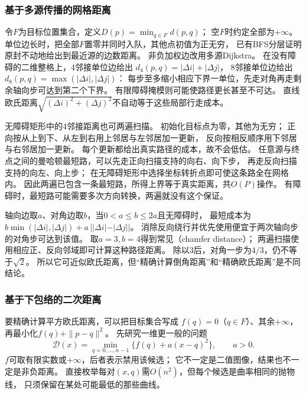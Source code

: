 \subsubsection{基于多源传播的网格距离}
\label{sec:graph-grid-distance}
令$F$为目标位置集合，定义$D(p)=\min_{q\in F}d(p,q)$；
空$F$时约定全部为$+\infty$。
单位边长时，把全部$F$置零并同时入队，其他点初值为正无穷，
已有BFS分层证明原封不动地给出到最近源的边数距离。
非负加权边改用多源Dijkstra。
在没有障碍的二维整格上，4邻接单位边给出
$d_4(p,q)=|\Delta i|+|\Delta j|$，
8邻接单位边给出$d_8(p,q)=\max(|\Delta i|,|\Delta j|)$：
每步至多缩小相应下界一单位，先走对角再走剩余轴向步可达到第二个下界。
有限障碍掩模则可能使路径更长甚至不可达。
直线欧氏距离$\sqrt{(\Delta i)^2+(\Delta j)^2}$不自动等于这些局部行走成本。

无障碍矩形中的4邻接距离也可两遍扫描。
初始化目标点为零，其他为无穷；
正向按从上到下、从左到右用上邻居与左邻居加一更新，
反向按相反顺序用下邻居与右邻居加一更新。
每个更新都给出真实路径的成本，故不会低估。
任意源与终点之间的曼哈顿最短路，可以先走正向扫描支持的向右、向下步，
再走反向扫描支持的向左、向上步；
在无障碍矩形中选择坐标转折点即可使这条路全在网格内。
因此两遍已包含一条最短路，所得上界等于真实距离，共$O(P)$操作。
有障碍时，最短路可能需要多次方向转换，两遍就没有这个保证。

轴向边取$a$、对角边取$b$，当$0<a\leq b\leq2a$且无障碍时，
最短成本为
$b\min(|\Delta i|,|\Delta j|)+a\,||\Delta i|-|\Delta j||$。
消除反向绕行并优先使用便宜于两次轴向步的对角步可达到该值。
取$a=3,b=4$得到常见（chamfer distance）；
两遍扫描使用相应正、反向邻域即可计算这种路径距离。
除以$3$后，对角一步为$4/3$，仍不等于$\sqrt2$。
所以它可近似欧氏距离，但“精确计算倒角距离”和“精确欧氏距离”是不同结论。

\subsubsection{基于下包络的二次距离}
\label{sec:graph-quadratic-distance}
要精确计算平方欧氏距离，可以把目标集合写成
$f(q)=0$（$q\in F$）、其余$+\infty$，再最小化$f(q)+\|p-q\|^2$。
先研究一维更一般的问题
\begin{equation}
 \mathcal D(x)=\min_{q=0,\ldots,n-1}\{f(q)+a(x-q)^2\},\qquad a>0.
 \label{eq:graph-quadratic-distance-transform}
\end{equation}
$f$可取有限实数或$+\infty$，后者表示禁用该候选；
它不一定是二值图像，结果也不一定是非负距离。
直接枚举每对$(x,q)$需$O(n^2)$，但每个候选是曲率相同的抛物线，
只须保留在某处可能最低的那些曲线。

